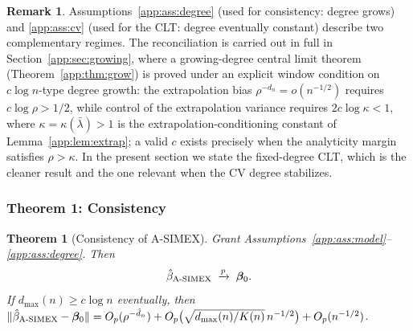 \documentclass[11pt]{article}
\theoremstyle{plain}
\newtheorem{theorem}{Theorem}
\theoremstyle{definition}
\newtheorem{remark}{Remark}
\newcommand{\bet}{\bm{\beta}}
\newcommand{\asimex}{\textup{A-SIMEX}}
\begin{document}
\begin{remark}\label{app:rem:cvreconcile}
Assumptions~\ref{app:ass:degree} (used for consistency: degree grows) and
\ref{app:ass:cv} (used for the CLT: degree eventually constant) describe two
complementary regimes. The reconciliation is carried out in full in
Section~\ref{app:sec:growing}, where a growing-degree central limit theorem
(Theorem~\ref{app:thm:grow}) is proved under an explicit window condition on
$c\log n$-type degree growth: the extrapolation bias
$\rho^{-d_n}=o(n^{-1/2})$ requires $c\log\rho>1/2$, while control of the
extrapolation variance requires $2c\log\kappa<1$, where
$\kappa=\kappa(\bar\lambda)>1$ is the extrapolation-conditioning constant
of Lemma~\ref{app:lem:extrap}; a valid $c$ exists precisely when the
analyticity margin satisfies $\rho>\kappa$. In the present section we
state the fixed-degree CLT, which is the cleaner result and the one
relevant when the CV degree stabilizes.
\end{remark}

\subsubsection{Theorem 1: Consistency}\label{app:sec:consistency}

\begin{theorem}[Consistency of \asimex{}]\label{app:thm:cons}
Grant Assumptions~\ref{app:ass:model}--\ref{app:ass:degree}. Then
\[
  \hat\beta_{\asimex}\;\xrightarrow{p}\;\bet_0 .
\]
If $d_{\max}(n)\ge c\log n$ eventually, then
$\|\hat\beta_{\asimex}-\bet_0\|=O_p(\rho^{-\hat d_n})
+O_p\bigl(\sqrt{d_{\max}(n)/K(n)}\,n^{-1/2}\bigr)
+O_p(n^{-1/2})$.
\end{theorem}
\end{document}
